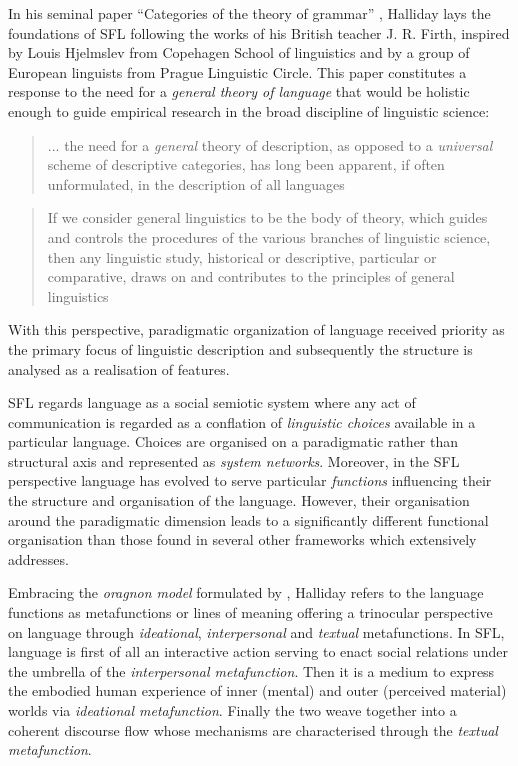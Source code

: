 In his seminal paper ``Categories of the theory of grammar'' \citep{Halliday61-orig}, Halliday lays the foundations of SFL following the works of his British teacher J. R. Firth, inspired by Louis Hjelmslev \citep{Hjelmslev53} from Copehagen School of linguistics and by a group of European linguists from Prague Linguistic Circle. This paper constitutes a response to the need for a \textit{general theory of language} that would be holistic enough to guide empirical research in the broad discipline of linguistic science:
\begin{quotation}
    ... the need for a \textit{general} theory of description, as opposed to a \textit{universal} scheme of descriptive categories, has long been apparent, if often unformulated, in the description of all languages \citep[54; emphasis in original]{Halliday57}
\end{quotation} 
\begin{quotation}
    If we consider general linguistics to be the body of theory, which guides and controls the procedures of the various branches of linguistic science, then any linguistic study, historical or descriptive, particular or comparative, draws on and contributes to the principles of general linguistics \citep[55]{Halliday57}
\end{quotation} 

With this perspective, paradigmatic organization of language received priority as the primary focus of linguistic description and subsequently the structure is analysed as a realisation of features. 


SFL regards language as a social semiotic system where any act of communication is regarded as a conflation of \textit{linguistic choices} available in a particular language. Choices are organised on a paradigmatic rather than structural axis and represented as \textit{system networks}. Moreover, in the SFL perspective language has evolved to serve particular \textit{functions} influencing their the structure and organisation of the language. However, their organisation around the paradigmatic dimension leads to a significantly different functional organisation than those found in several other frameworks which \citet{Butler2003-pt1, Butler2003-pt2} extensively addresses. 

Embracing the \textit{oragnon model} formulated by \citet{Buhler34}, Halliday refers to the language functions as metafunctions or lines of meaning offering a trinocular perspective on language through \textit{ideational}, \textit{interpersonal} and \textit{textual} metafunctions. In SFL, language is first of all an interactive action serving to enact social relations under the umbrella of the \textit{interpersonal metafunction}. Then it is a medium to express the embodied human experience of inner (mental) and outer (perceived material) worlds via \textit{ideational metafunction}. Finally the two weave together into a coherent discourse flow whose mechanisms are characterised through the \textit{textual metafunction}.

